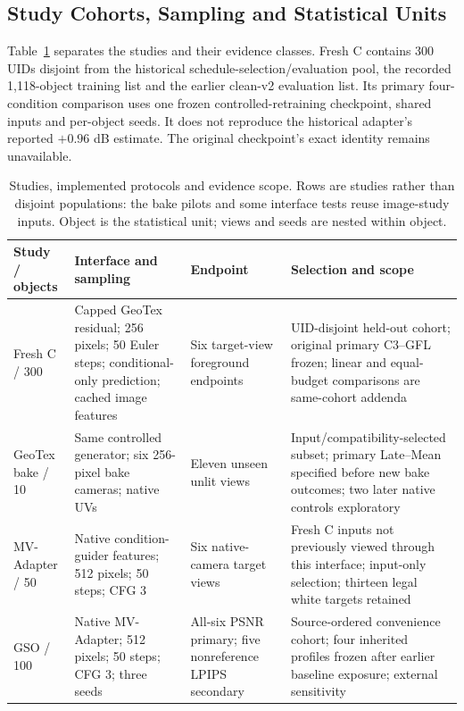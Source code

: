 \documentclass[times,twocolumn,final]{elsarticle}
\begin{document}
\subsection{Study Cohorts, Sampling and Statistical Units}
\label{subsec:setup}

Table~\ref{tab:study-design} separates the studies and their evidence classes. Fresh C contains 300 UIDs disjoint from the historical schedule-selection/evaluation pool, the recorded 1,118-object training list and the earlier clean-v2 evaluation list. Its primary four-condition comparison uses one frozen controlled-retraining checkpoint, shared inputs and per-object seeds. It does not reproduce the historical adapter's reported $+0.96$ dB estimate. The original checkpoint's exact identity remains unavailable.

\begin{table}[t]
\centering\scriptsize\setlength{\tabcolsep}{3pt}
\caption{Studies, implemented protocols and evidence scope. Rows are studies rather than disjoint populations: the bake pilots and some interface tests reuse image-study inputs. Object is the statistical unit; views and seeds are nested within object.}
\label{tab:study-design}
\begin{tabular}{p{}p{}p{}p{}}
\toprule Study / objects & Interface and sampling & Endpoint & Selection and scope \\
\midrule
Fresh C / 300 & Capped GeoTex residual; 256 pixels; 50 Euler steps; conditional-only prediction; cached image features & Six target-view foreground endpoints & UID-disjoint held-out cohort; original primary C3--GFL frozen; linear and equal-budget comparisons are same-cohort addenda \\
GeoTex bake / 10 & Same controlled generator; six 256-pixel bake cameras; native UVs & Eleven unseen unlit views & Input/compatibility-selected subset; primary Late--Mean specified before new bake outcomes; two later native controls exploratory \\
MV-Adapter / 50 & Native condition-guider features; 512 pixels; 50 steps; CFG 3 & Six native-camera target views & Fresh C inputs not previously viewed through this interface; input-only selection; thirteen legal white targets retained \\
GSO / 100 & Native MV-Adapter; 512 pixels; 50 steps; CFG 3; three seeds & All-six PSNR primary; five nonreference LPIPS secondary & Source-ordered convenience cohort; four inherited profiles frozen after earlier baseline exposure; external sensitivity \\

\end{tabular}
\end{table}
\end{document}

